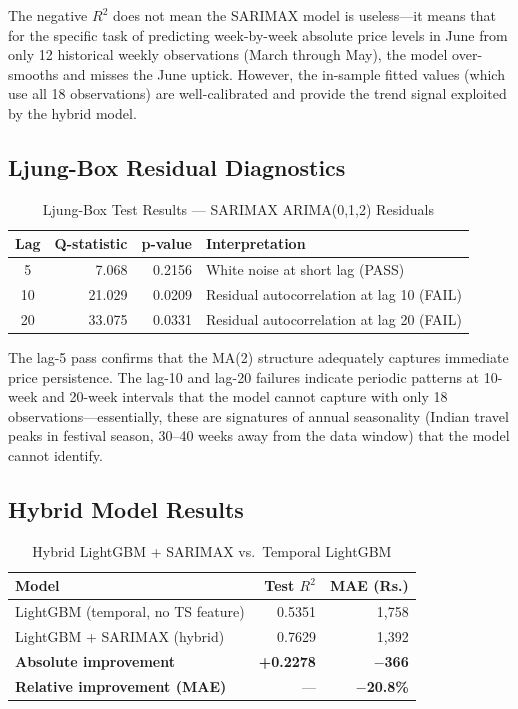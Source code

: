 \documentclass[12pt, a4paper]{article}
\begin{document}
The negative $R^2$ does not mean the SARIMAX model is useless---it means
that for the specific task of predicting week-by-week absolute price levels
in June from only 12 historical weekly observations (March through May), the
model over-smooths and misses the June uptick.  However, the in-sample fitted
values (which use all 18 observations) are well-calibrated and provide the
trend signal exploited by the hybrid model.

\subsection{Ljung-Box Residual Diagnostics}

\begin{table}[h]
\caption{Ljung-Box Test Results --- SARIMAX ARIMA(0,1,2) Residuals}
\label{tab:ljungbox}
\centering
\begin{tabular}{crrl}
\toprule
\textbf{Lag} & \textbf{Q-statistic} & \textbf{p-value} & \textbf{Interpretation} \\
\midrule
5  & 7.068  & 0.2156 & White noise at short lag (PASS) \\
10 & 21.029 & 0.0209 & Residual autocorrelation at lag 10 (FAIL) \\
20 & 33.075 & 0.0331 & Residual autocorrelation at lag 20 (FAIL) \\
\bottomrule
\end{tabular}
\end{table}

The lag-5 pass confirms that the MA(2) structure adequately captures
immediate price persistence.  The lag-10 and lag-20 failures indicate
periodic patterns at 10-week and 20-week intervals that the model cannot
capture with only 18 observations---essentially, these are signatures of
annual seasonality (Indian travel peaks in festival season, 30--40 weeks
away from the data window) that the model cannot identify.

\subsection{Hybrid Model Results}

\begin{table}[h]
\caption{Hybrid LightGBM + SARIMAX vs.\ Temporal LightGBM}
\label{tab:hybrid}
\centering
\begin{tabular}{lrr}
\toprule
\textbf{Model} & \textbf{Test $R^2$} & \textbf{MAE (Rs.)} \\
\midrule
LightGBM (temporal, no TS feature) & 0.5351 & 1{,}758 \\
LightGBM + SARIMAX (hybrid)         & 0.7629 & 1{,}392 \\
\midrule
\textbf{Absolute improvement}       & \textbf{+0.2278} & \textbf{$-$366} \\
\textbf{Relative improvement (MAE)} & --- & \textbf{$-$20.8\%} \\
\bottomrule
\end{tabular}
\end{table}
\end{document}
